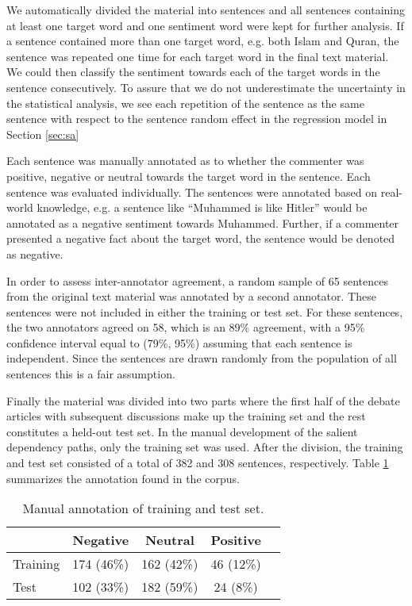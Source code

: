 \documentclass[11pt]{article}
\begin{document}
We automatically divided the material into sentences and all sentences containing at least one target word and one sentiment word were kept for further analysis. If a sentence contained more than one target word, e.g. both Islam and Quran, the sentence was repeated one time for each target word in the final text material. We could then classify the sentiment towards each of the target words in the sentence consecutively. To assure that we do not underestimate the uncertainty in the statistical analysis, we see each repetition of the sentence as the same sentence with respect to the sentence random effect in the regression model in Section \ref{sec:sa}

Each sentence was manually annotated as to whether the commenter was positive, negative or neutral towards the target word in the sentence. Each sentence was evaluated individually. The sentences were annotated based on real-world knowledge, e.g. a sentence like ``Muhammed is like Hitler'' would be annotated as a negative sentiment towards Muhammed. Further, if a commenter presented a negative fact about the target word, the sentence would be denoted as negative.

In order to assess inter-annotator agreement, a random sample of 65 sentences from the original text material was annotated by a second annotator. These sentences were not included in either the training or test set. For these sentences, the two annotators agreed on 58, which is an 89\% agreement, with a 95\% confidence interval equal to (79\%, 95\%) assuming that each sentence is independent. Since the sentences are drawn randomly from the population of all sentences this is a fair assumption.

Finally the material was divided into two parts where the first half of the debate articles with subsequent discussions make up the training set and the rest constitutes a held-out test set. In the manual development of the salient dependency paths, only the training set was used. After the division, the training and test set consisted of a total of 382 and 308 sentences, respectively. Table \ref{tab:1} summarizes the annotation found in the corpus.
\begin{table}
  \centering
  \begin{tabular}{|l|ccc|c} 
     \hline        & \bf Negative & \bf Neutral & \bf Positive \\\hline
    Training & 174 (46\%) & 162 (42\%) & 46 (12\%)\\
    Test     & 102 (33\%)& 182 (59\%) & 24 (8\%)\\\hline
  \end{tabular}
  \label{tab:1}
  \caption{Manual annotation of training and test set.}
\end{table}
\end{document}
